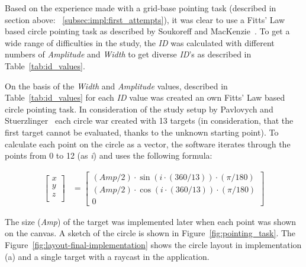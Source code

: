 Based on the experience made with a grid-base pointing task (described in section above: ~\ref{subsec:impl:first_attempts}), it was clear to use a Fitts' Law based circle pointing task as described by Soukoreff and MacKenzie~\cite{soukoreff_towards_2004}. To get a wide range of difficulties in the study, the \textit{ID} was calculated with different numbers of \textit{Amplitude} and \textit{Width} to get diverse \textit{ID}'s as described in Table~\ref{tab:id_values}.

On the basis of the \textit{Width} and \textit{Amplitude} values, described in Table~\ref{tab:id_values} for each \textit{ID} value was created an own Fitts' Law based circle pointing task.  In consideration of the study setup by Pavlovych and Stuerzlinger~\cite{pavlovych_tradeoff_2009} each circle war created with 13 targets (in consideration, that the first target cannot be evaluated, thanks to the unknown starting point). To calculate each point on the circle as a vector, the software iterates through the points from 0 to 12 (as \textit{i}) and uses the following formula:

\begin{align}
    \begin{bmatrix}
        x \\
        y \\
        z \\
    \end{bmatrix} &= \begin{bmatrix}
                        (Amp / 2) \cdot \sin(i \cdot (360 / 13)) \cdot (\pi / 180) \\
                        (Amp / 2) \cdot \cos(i \cdot (360 / 13)) \cdot (\pi / 180) \\
                        0
                     \end{bmatrix}
\end{align}

The size (\textit{Amp}) of the target was implemented later when each point was shown on the canvas. A sketch of the circle is shown in Figure~\ref{fig:pointing_task}. The Figure~\ref{fig:layout-final-implementation} shows the circle layout in implementation (a) and a single target with a raycast in the application.

